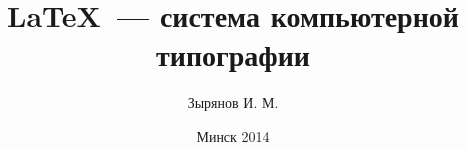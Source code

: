 \title[\LaTeX~--- система компьютерной типографии]{\LaTeX~--- система компьютерной типографии}
\author{Зырянов И. М.}
\date{Минск 2014}

